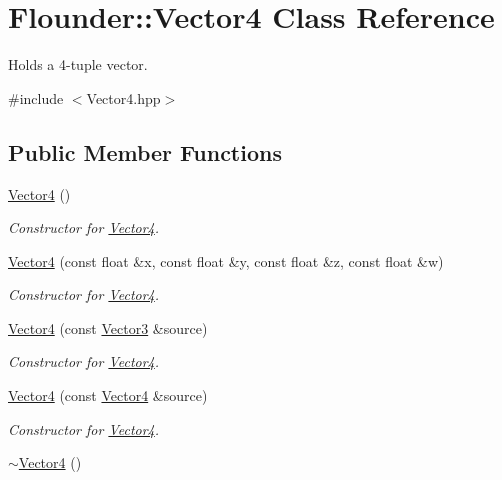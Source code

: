 \hypertarget{class_flounder_1_1_vector4}{}\section{Flounder\+:\+:Vector4 Class Reference}
\label{class_flounder_1_1_vector4}


Holds a 4-\/tuple vector.  




{\ttfamily \#include $<$Vector4.\+hpp$>$}

\subsection*{Public Member Functions}
\begin{DoxyCompactItemize}
\item 
\hyperlink{class_flounder_1_1_vector4_a104680995117ea8aa91fe36eb1960a34}{Vector4} ()
\begin{DoxyCompactList}\small\item\em Constructor for \hyperlink{class_flounder_1_1_vector4}{Vector4}. \end{DoxyCompactList}\item 
\hyperlink{class_flounder_1_1_vector4_a498939229349ac6e1e4a8646988e25b8}{Vector4} (const float \&x, const float \&y, const float \&z, const float \&w)
\begin{DoxyCompactList}\small\item\em Constructor for \hyperlink{class_flounder_1_1_vector4}{Vector4}. \end{DoxyCompactList}\item 
\hyperlink{class_flounder_1_1_vector4_a862a9191f7dfa7f44ffe10fe214abe16}{Vector4} (const \hyperlink{class_flounder_1_1_vector3}{Vector3} \&source)
\begin{DoxyCompactList}\small\item\em Constructor for \hyperlink{class_flounder_1_1_vector4}{Vector4}. \end{DoxyCompactList}\item 
\hyperlink{class_flounder_1_1_vector4_a3c9849f7ef839181badad7f3d305113b}{Vector4} (const \hyperlink{class_flounder_1_1_vector4}{Vector4} \&source)
\begin{DoxyCompactList}\small\item\em Constructor for \hyperlink{class_flounder_1_1_vector4}{Vector4}. \end{DoxyCompactList}\item 
\hyperlink{class_flounder_1_1_vector4_ab7e0e61d7bd628476466b5baef03d570}{$\sim$\+Vector4} ()

\end{DoxyCompactItemize}
